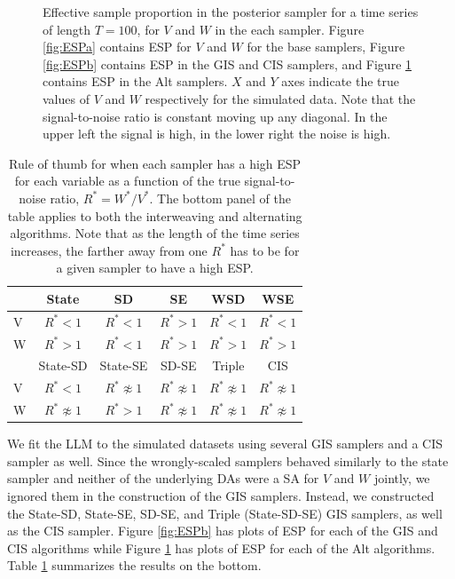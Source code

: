 \documentclass[12pt]{article}
\begin{document}
\begin{figure}[!h]
\begin{subfigure}[b]{0.45\textwidth}
\caption{}
\label{fig:ESPc}
\end{subfigure}
\caption{Effective sample proportion in the posterior sampler for a time series of length $T=100$, for $V$ and $W$ in the each sampler. Figure \ref{fig:ESPa} contains ESP for $V$ and $W$ for the base samplers, Figure \ref{fig:ESPb} contains ESP in the GIS and CIS samplers, and Figure \ref{fig:ESPc} contains ESP in the Alt samplers. $X$ and $Y$ axes indicate the true values of $V$ and $W$ respectively for the simulated data. Note that the signal-to-noise ratio is constant moving up any diagonal. In the upper left the signal is high, in the lower right the noise is high.}
\label{ESplot}
\end{figure}

\begin{table}
  \centering
  \begin{tabular}{lccccc}\hline
     & State           & SD                 & SE                  & WSD                 & WSE \\\hline
   V & $R^* < 1$       & $R^* < 1$           & $R^* > 1$           & $R^* < 1$           & $R^* < 1$ \\ 
   W & $R^* > 1$       & $R^* < 1$           & $R^* > 1$           & $R^* > 1$           & $R^* > 1$ \\ \hline
     & State-SD        & State-SE            & SD-SE              & Triple              & CIS \\\hline
   V & $R^* < 1$       & $R^* \not\approx 1$ & $R^* \not\approx 1$ & $R^* \not\approx 1$ & $R^* \not\approx 1$ \\
  W  &$R^* \not\approx 1$& $R^* > 1$          & $R^* \not\approx 1$ & $R^* \not\approx 1$ & $R^* \not\approx 1$\\\hline
  \end{tabular}
  \caption{Rule of thumb for when each sampler has a high ESP for each variable as a function of the true signal-to-noise ratio, $R^*=W^*/V^*$. The bottom panel of the table applies to both the interweaving and alternating algorithms. Note that as the length of the time series increases, the farther away from one $R^*$ has to be for a given sampler to have a high ESP.}
  \label{tab:stnmix}
\end{table}

We fit the LLM to the simulated datasets using several GIS samplers and a CIS sampler as well. Since the wrongly-scaled samplers behaved similarly to the state sampler and neither of the underlying DAs were a SA for $V$ and $W$ jointly, we ignored them in the construction of the GIS samplers. Instead, we constructed the State-SD, State-SE, SD-SE, and Triple (State-SD-SE) GIS samplers, as well as the CIS sampler. Figure \ref{fig:ESPb} has plots of ESP for each of the GIS and CIS algorithms while Figure \ref{fig:ESPc} has plots of ESP for each of the Alt algorithms. Table \ref{tab:stnmix} summarizes the results on the bottom.
\end{document}
